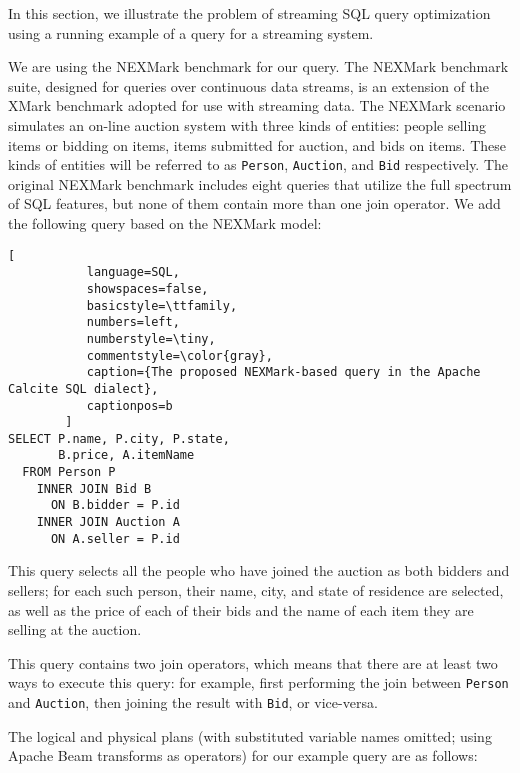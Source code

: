 \label {sec:fs-optimization-problem-statement}

In this section, we illustrate the problem of streaming SQL query optimization using a running example of a query for a streaming system.

We are using the NEXMark benchmark \cite{tucker2008nexmark} for our query. The NEXMark benchmark suite, designed for queries over continuous data streams, is an extension of the XMark benchmark \cite{schmidt2002xmark} adopted for use with streaming data. The NEXMark scenario simulates an on-line auction system with three kinds of entities: people selling items or bidding on items, items submitted for auction, and bids on items. These kinds of entities will be referred to as \texttt{Person}, \texttt{Auction}, and \texttt{Bid} respectively. The original NEXMark benchmark includes eight queries that utilize the full spectrum of SQL features, but none of them contain more than one join operator. We add the following query based on the NEXMark model: \\

\begin{lstlisting}[
           language=SQL,
           showspaces=false,
           basicstyle=\ttfamily,
           numbers=left,
           numberstyle=\tiny,
           commentstyle=\color{gray},
           caption={The proposed NEXMark-based query in the Apache Calcite SQL dialect}, 
           captionpos=b
        ]
SELECT P.name, P.city, P.state, 
       B.price, A.itemName 
  FROM Person P 
    INNER JOIN Bid B 
      ON B.bidder = P.id 
    INNER JOIN Auction A 
      ON A.seller = P.id
\end{lstlisting}

This query selects all the people who have joined the auction as both bidders and sellers; for each such person, their name, city, and state of residence are selected, as well as the price of each of their bids and the name of each item they are selling at the auction. 

This query contains two join operators, which means that there are at least two ways to execute this query: for example, first performing the join between \texttt{Person} and \texttt{Auction}, then joining the result with \texttt{Bid}, or vice-versa. 

The logical and physical plans (with substituted variable names omitted; using Apache Beam transforms as operators) for our example query are as follows: \\

